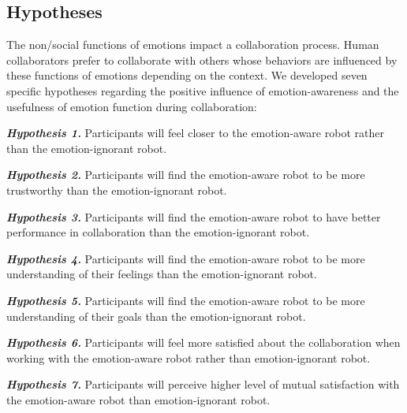 \documentclass[12pt]{report}
\begin{document}
\subsection{Hypotheses}
\label{sec:hypotheses}
The non/social functions of emotions impact a collaboration process. Human
collaborators prefer to collaborate with others whose behaviors are influenced
by these functions of emotions depending on the context. We developed seven
specific hypotheses regarding the positive influence of emotion-awareness and
the usefulness of emotion function during collaboration:

\textit{\textbf{Hypothesis 1.}} Participants will feel closer to the emotion-aware
robot rather than the emotion-ignorant robot.

\textit{\textbf{Hypothesis 2.}} Participants will find the emotion-aware robot to be
more trustworthy than the emotion-ignorant robot.

\textit{\textbf{Hypothesis 3.}} Participants will find the emotion-aware robot to
have better performance in collaboration than the emotion-ignorant robot.

\textit{\textbf{Hypothesis 4.}} Participants will find the emotion-aware robot to be
more understanding of their feelings than the emotion-ignorant robot.

\textit{\textbf{Hypothesis 5.}} Participants will find the emotion-aware robot to be
more understanding of their goals than the emotion-ignorant robot.

\textit{\textbf{Hypothesis 6.}} Participants will feel more satisfied about the
collaboration when working with the emotion-aware robot rather than
emotion-ignorant robot.

\textit{\textbf{Hypothesis 7.}} Participants will perceive higher level of mutual
satisfaction with the emotion-aware robot than emotion-ignorant robot.
\end{document}
